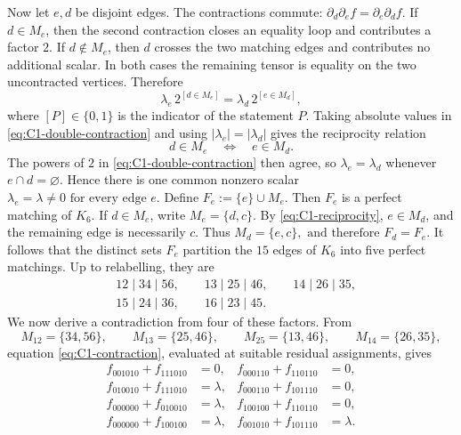 Now let \(e,d\) be disjoint edges.  The contractions commute:
$
    \partial_d\partial_e f
    =
    \partial_e\partial_d f.
$
If \(d\in M_e\), then the second contraction closes an equality loop
and contributes a factor \(2\).  If \(d\notin M_e\), then \(d\) crosses
the two matching edges and contributes no additional scalar.  In both
cases the remaining tensor is equality on the two uncontracted
vertices.  Therefore
\begin{equation}
    \lambda_e\,2^{[d\in M_e]}
    =
    \lambda_d\,2^{[e\in M_d]},
    \label{eq:C1-double-contraction}
\end{equation}
where \([P]\in\{0,1\}\) is the indicator of the statement \(P\).
Taking absolute values in \eqref{eq:C1-double-contraction} and using
\(|\lambda_e|=|\lambda_d|\) gives the reciprocity relation
\begin{equation}
    d\in M_e
    \quad\Longleftrightarrow\quad
    e\in M_d.
    \label{eq:C1-reciprocity}
\end{equation}
The powers of \(2\) in \eqref{eq:C1-double-contraction} then agree, so
\(\lambda_e=\lambda_d\) whenever \(e\cap d=\varnothing\).  
Hence there is
one common nonzero scalar
$
    \lambda_e=\lambda\neq 0
    \text{ for every edge \(e\).}
$
Define
$
    F_e:=\{e\}\cup M_e.
$
Then \(F_e\) is a perfect matching of \(K_6\).  
If \(d\in M_e\), write
\(M_e=\{d,c\}\).  By \eqref{eq:C1-reciprocity}, \(e\in M_d\), and the
remaining edge is necessarily \(c\).  Thus
$
    M_d=\{e,c\},
    \text{ and therefore }
    F_d=F_e.
$
It follows that the distinct sets \(F_e\) partition the \(15\) edges of
\(K_6\) into five perfect matchings.  
Up to relabelling, they are
\begin{equation}
\begin{aligned}
    &12\mid 34\mid 56, \qquad
     13\mid 25\mid 46, \qquad
     14\mid 26\mid 35,\\
    &15\mid 24\mid 36, \qquad
     16\mid 23\mid 45.
\end{aligned}
\label{eq:C1-factorization}
\end{equation}
We now derive a contradiction from four of these factors.  From
\[
    M_{12}=\{34,56\},\qquad
    M_{13}=\{25,46\},\qquad
    M_{25}=\{13,46\},\qquad
    M_{14}=\{26,35\},
\]
equation \eqref{eq:C1-contraction}, evaluated at suitable residual
assignments, gives
\begin{align}
    f_{001010}+f_{111010}&=0,
    &
    f_{000110}+f_{110110}&=0,
    \label{eq:C1-eight-a}\\
    f_{010010}+f_{111010}&=\lambda,
    &
    f_{000110}+f_{101110}&=0,
    \label{eq:C1-eight-b}\\
    f_{000000}+f_{010010}&=\lambda,
    &
    f_{100100}+f_{110110}&=0,
    \label{eq:C1-eight-c}\\
    f_{000000}+f_{100100}&=\lambda,
    &
    f_{001010}+f_{101110}&=\lambda.
    \label{eq:C1-eight-d}
\end{align}
